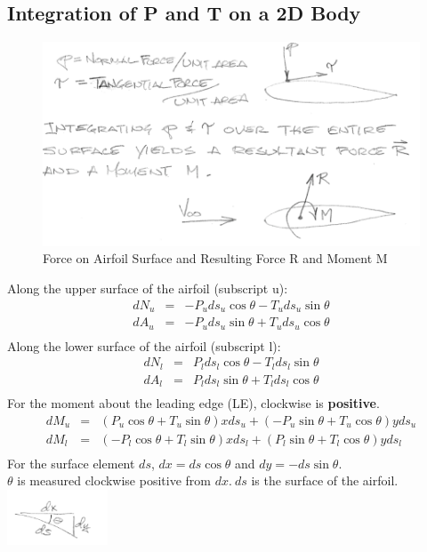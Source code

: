 \documentclass[draft=false, titlepage]{article}
\begin{document}
\subsection{Integration of P and T on a 2D Body}
\begin{figure}[ht]
    \centering
    \includegraphics[width=0.6\linewidth]{Figures/p2_1.png}
    \caption{Force on Airfoil Surface and Resulting Force R and Moment M}
    \label{fig:p3_1}
\end{figure}

Along the upper surface of the airfoil (subscript u):
\begin{equation*}
    \begin{array}{rcl}
         dN_u &=& -P_u ds_u\cos\theta - T_u ds_u \sin\theta \\
         dA_u &=& -P_uds_u \sin\theta + T_uds_u \cos\theta \\
    \end{array}
\end{equation*}
Along the lower surface of the airfoil (subscript l):
\begin{equation*}
    \begin{array}{rcl}
         dN_l &=& P_l ds_l\cos\theta - T_l ds_l \sin\theta \\
         dA_l &=& P_lds_l \sin\theta + T_lds_l \cos\theta \\
    \end{array}
\end{equation*}
For the moment about the leading edge (LE), clockwise is \textbf{positive}.
\begin{equation*}
    \begin{array}{rcl}
    dM_u &=& (P_u\cos\theta + T_u\sin\theta)xds_u + (-P_u\sin\theta + T_u\cos\theta)yds_u \\
    dM_l &=& (-P_l\cos\theta + T_l\sin\theta )xds_l + (P_l \sin\theta + T_l\cos\theta)yds_l \\
    \end{array}
\end{equation*}
For the surface element $ds$, $dx = ds \cos\theta $ and $dy = -ds\sin\theta$.\\
$\theta$ is measured clockwise positive from $dx.\ ds$ is the surface of the airfoil.
   \includegraphics[width=30mm]{Figures/surface_element.PNG}
\end{document}
